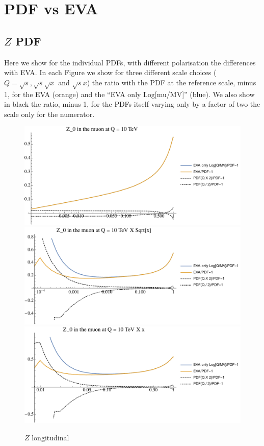 \documentclass[a4paper,11pt]{article}
\begin{document}
\clearpage

\section{PDF vs EVA}
\label{app:PDFsEVA}

\subsection{$Z$ PDF}
\label{app:PDFsEVA_Z}


Here we show for the individual PDFs, with different polarisation the differences with EVA. In each Figure we show for three different scale choices ($Q=\sqrt{s}, \sqrt{s} \sqrt{x}$ and $\sqrt{s} x$) the ratio with the PDF at the reference scale, minus 1, for the EVA (orange) and the ``EVA only Log[mu/MV]'' (blue). We also show in black the ratio, minus 1, for the PDFs itself varying only by a factor of two the scale only for the numerator. 



\begin{figure}[!b]
\includegraphics[width=0.46\linewidth]{Notebooks/PlotPDFs/ratios/10TeV/Z_0_Q.pdf}
\includegraphics[width=0.46\linewidth]{Notebooks/PlotPDFs/ratios/10TeV/Z_0_Qsqrtx.pdf}
\includegraphics[width=0.46\linewidth]{Notebooks/PlotPDFs/ratios/10TeV/Z_0_Qx.pdf}
\caption{$Z$ longitudinal}
\end{figure}
\end{document}
